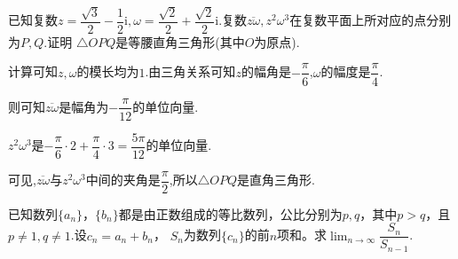 \begin{questions}
	\question 已知复数$z=\dfrac{\sqrt{3}}{2} - \dfrac12\text{i}, \omega = \dfrac{\sqrt{2}}{2} +
		\dfrac{\sqrt{2}}{2}\text{i}$.复数$\overline{z\omega},z^2\omega^3$在复数平面上所对应的点分别为$P,Q$.证明
	$\triangle{OPQ}$是等腰直角三角形(其中$O$为原点).

	\begin{solution}
		计算可知$z,\omega$的模长均为$1$.由三角关系可知$z$的幅角是$-\dfrac{\pi}{6}$,$\omega$的幅度是$\dfrac{\pi}{4}$.

		则可知$\overline{z\omega}$是幅角为$-\dfrac{\pi}{12}$的单位向量.

		$z^2\omega^3$是$-\dfrac{\pi}{6}\cdot2 + \dfrac{\pi}{4}\cdot3=\dfrac{5\pi}{12}$的单位向量.

		可见,$\overline{z\omega}$与$z^2\omega^3$中间的夹角是$\dfrac{\pi}{2}$,所以$\triangle{OPQ}$是直角三角形.
	\end{solution}

	\question 已知数列$\{a_n\}， \{b_n\}$都是由正数组成的等比数列，公比分别为$p,q$，其中$p>q$，且$p\neq1, q\neq1$.设$c_n
		= a_n+b_n$， $S_n$为数列$\{c_n\}$的前$n$项和。求$\displaystyle\lim_{n\to\infty}\dfrac{S_n}{S_{n-1}}$.


\end{questions}
